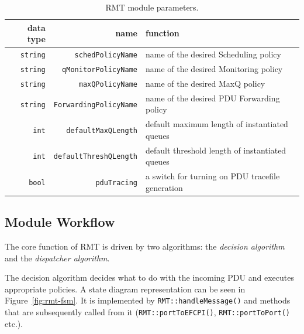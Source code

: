             \begin{table}[H]
                \begin{center}
                  \begin{tabular}{ | r | r | l | }
                    \hline
                    data type & name & function \\
                    \hline
                    \texttt{string} & \texttt{schedPolicyName} & name of the desired Scheduling policy \\
                    \texttt{string} & \texttt{qMonitorPolicyName} & name of the desired Monitoring policy \\
                    \texttt{string} & \texttt{maxQPolicyName} & name of the desired MaxQ policy \\
                    \texttt{string} & \texttt{ForwardingPolicyName} & name of the desired PDU Forwarding policy \\
                    \texttt{int} & \texttt{defaultMaxQLength} & default maximum length of instantiated queues \\
                    \texttt{int} & \texttt{defaultThreshQLength} & default threshold length of instantiated queues \\
                    \texttt{bool} & \texttt{pduTracing} & a switch for turning on PDU tracefile generation \\
                    \hline
                  \end{tabular}
                  \caption{RMT module parameters.}
                  \label{fig:rmt_params}
                \end{center}
            \end{table}

        \subsection{Module Workflow}

            The core function of RMT is driven by two algorithms: the \emph{decision algorithm} and the \emph{dispatcher algorithm}.

            The decision algorithm decides what to do with the incoming PDU and executes appropriate policies. A state diagram representation can be seen in Figure~\ref{fig:rmt-fsm}. It is implemented by \texttt{RMT::handleMessage()} and methods that are subsequently called from it (\texttt{RMT::portToEFCPI()}, \texttt{RMT::portToPort()} etc.).

